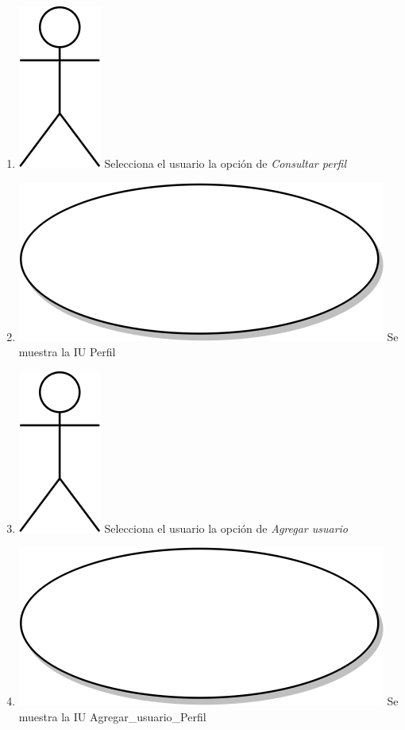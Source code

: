 \begin{enumerate}
\item {\includegraphics[scale=.1]{Capitulo3/img/actor.png} Selecciona el usuario la opción de \textit{Consultar perfil}}
\item {\includegraphics[scale=.05]{Capitulo3/img/proceso.png} Se muestra la IU Perfil}
\item {\includegraphics[scale=.1]{Capitulo3/img/actor.png} Selecciona el usuario la opción de \textit{Agregar usuario}}
\item {\includegraphics[scale=.05]{Capitulo3/img/proceso.png} Se muestra la IU Agregar_usuario_Perfil}

\end{enumerate}
